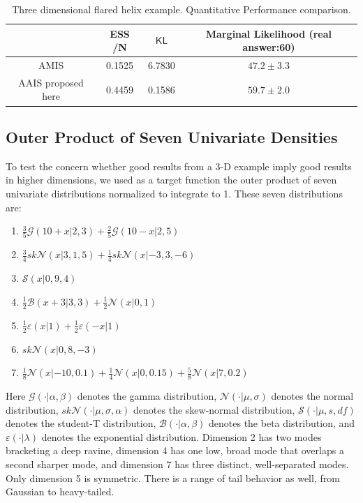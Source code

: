 \documentclass[aoas]{imsart}
\def\KL{\textsf{KL}}
\def\ESS{\textsf{ESS }}
\begin{document}
\begin{table}
\begin{tabular}{c||c|c|c}
 & \ESS/N & $\KL$ & Marginal Likelihood (real answer:60) \\
\hline AMIS \citep{cappe2008ais} & 0.1525 & 6.7830 & $47.2\pm3.3$\\
\hline AAIS proposed here & 0.4459 & 0.1586 & $59.7\pm2.0$\\
\hline
\end{tabular}
\caption{Three dimensional flared helix example. Quantitative
Performance comparison.}\label{comparison_3D}
\end{table}

\subsection{ Outer Product of Seven Univariate Densities}
To test the concern whether good results from a 3-D example imply
good results in higher dimensions, we used as a target function the
outer product of seven univariate distributions normalized to
integrate to 1. These seven distributions are:
\begin{enumerate}
\item $\frac{3}{5}\mathcal{G}(10+x|2,3)+\frac{2}{5}\mathcal{G}(10-x|2,5)$
\item $\frac{3}{4}sk\mathcal{N}(x|3,1,5)+\frac{1}{4}sk\mathcal{N}(x|-3,3,-6)$
\item $\mathcal{S}(x|0,9,4)$
\item $\frac{1}{2}\mathcal{B}(x+3|3,3)+\frac{1}{2}\mathcal{N}(x|0,1)$
\item $\frac{1}{2}\varepsilon(x|1)+\frac{1}{2}\varepsilon(-x|1)$
\item $sk\mathcal{N}(x|0,8,-3)$
\item $\frac{1}{8}\mathcal{N}(x|-10,0.1)+\frac{1}{4}\mathcal{N}(x|0,0.15)+\frac{5}{8}\mathcal{N}(x|7,0.2)$
\end{enumerate}
Here $\mathcal{G}(\cdot|\alpha,\beta)$ denotes the gamma
distribution, $\mathcal{N}(\cdot|\mu,\sigma)$ denotes the normal
distribution, $sk\mathcal{N}(\cdot|\mu,\sigma,\alpha)$ denotes the
skew-normal distribution, $\mathcal{S}(\cdot|\mu,s,df)$ denotes the
student-T distribution, $\mathcal{B}(\cdot|\alpha,\beta)$ denotes
the beta distribution, and $\varepsilon(\cdot|\lambda)$ denotes the
exponential distribution. Dimension 2 has two modes bracketing a
deep ravine, dimension 4 has one low, broad mode that overlaps a
second sharper mode, and dimension 7 has three distinct,
well-separated modes. Only dimension 5 is symmetric. There is a
range of tail behavior as well, from Gaussian to heavy-tailed.
\end{document}
